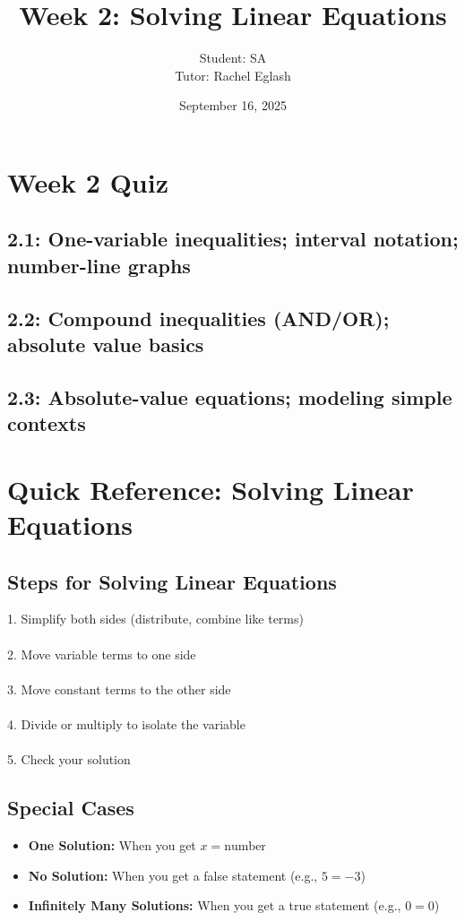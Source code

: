 \documentclass[12pt]{article}
\title{Week 2: Solving Linear Equations}
\author{
	Student: SA\\
	Tutor: Rachel Eglash}
\date{September 16, 2025}
\begin{document}
	
	\maketitle

	\section*{Week 2 Quiz}

        \subsection*{2.1: One-variable inequalities; interval notation; number-line graphs}

	    \subsection*{2.2: Compound inequalities (AND/OR); absolute value basics}
        
        \subsection*{2.3: Absolute-value equations; modeling simple contexts}
	    
            \newpage
	
	\section*{Quick Reference: Solving Linear Equations}
	
        \subsection*{Steps for Solving Linear Equations}
            1. Simplify both sides (distribute, combine like terms)\\\\
            2. Move variable terms to one side\\\\
            3. Move constant terms to the other side\\\\
            4. Divide or multiply to isolate the variable\\\\
            5. Check your solution

	    \subsection*{Special Cases}
        	\begin{itemize}
            	\item \textbf{One Solution:} When you get $x = \text{number}$
                \item \textbf{No Solution:} When you get a false statement (e.g., $5 = -3$)
                \item \textbf{Infinitely Many Solutions:} When you get a true statement (e.g., $0 = 0$)
            \end{itemize}
	
\end{document}
